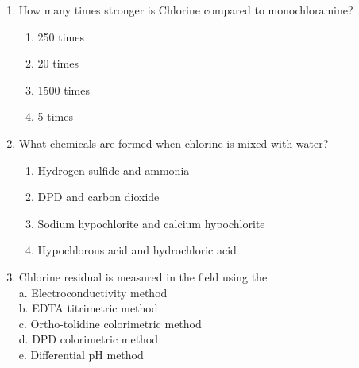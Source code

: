 \documentclass{article}
\begin{document}
\begin{enumerate}
\item  How many times stronger is Chlorine compared to monochloramine?\\
\begin{enumerate}
\item 250 times\\
\item 20 times\\
\item 1500 times\\
\item 5 times
\end{enumerate}

\item What chemicals are formed when chlorine is mixed with water?
\begin{enumerate}
\item Hydrogen sulfide and ammonia
\item DPD and carbon dioxide
\item Sodium hypochlorite and calcium hypochlorite
\item Hypochlorous acid and hydrochloric acid
\end{enumerate}

  \item Chlorine residual is measured in the field using the\\
a. Electroconductivity method\\
b. EDTA titrimetric method\\
c. Ortho-tolidine colorimetric method\\
d. DPD colorimetric method\\
e. Differential $\mathrm{pH}$ method\\


\end{enumerate}
\end{document}
